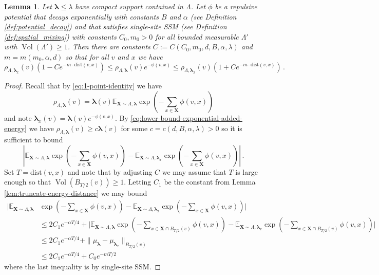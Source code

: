\documentclass[10pt]{amsart}
\newtheorem{lemma}[theorem]{Lemma}
\theoremstyle{definition}
\theoremstyle{remark}
\newcommand{\bX}{\mathbf{X}}
\newcommand{\Vol}{\operatorname{Vol}}
\newcommand{\blambda}{{\boldsymbol{\lambda}}}
\newcommand{\dist}{\mathrm{dist}}
\newcommand{\E}{\mathbb{E}}
\begin{document}
	\begin{lemma}\label{lem:1-pt-SSSSM}
		Let $\blambda \leq \lambda$ have compact support contained in $\Lambda$.   Let $\phi$ be a repulsive potential that decays exponentially with constants $B$ and $\alpha$ (see Definition \ref{def:potential_decay}) and that satisfies single-site SSM (see Definition \ref{def:spatial_mixing}) with constants $C_0,m_0 > 0$ for all bounded measurable $\Lambda'$ with $\Vol(\Lambda') \geq 1$.  Then there are constants $C := C(C_0,m_0,d,B,\alpha,\lambda)$ and $m = m(m_0,\alpha,d)$ so that for all $v$ and $x$ we have \begin{equation*}
			\rho_{\Lambda,\blambda_x}(v)\left( 1 - C e^{-m \cdot\dist(v,x)}\right) \leq \rho_{\Lambda,\blambda}(v) e^{-\phi(v,x)} \leq \rho_{\Lambda,\blambda_x}(v)\left( 1 + C e^{-m \cdot\dist(v,x)}\right)\,.
		\end{equation*}
	\end{lemma}
	\begin{proof}
		Recall that by \eqref{eq:1-point-identity} we have $$\rho_{\Lambda,\blambda}(v) = \blambda(v) \E_{\bX \sim \Lambda, \blambda} \exp\left(-\sum_{x \in \bX} \phi(v,x) \right)$$
		and note $\blambda_x(v) = \blambda(v) e^{-\phi(v,x)}.$
		By \eqref{eq:lower-bound-exponential-added-energy} we have $\rho_{\Lambda,\blambda}(v) \geq c\blambda(v)$ for some $c = c(d,B,\alpha,\lambda) > 0$ so it is sufficient to bound \begin{equation*}
			\left|\E_{\bX \sim \Lambda, \blambda} \exp\left(-\sum_{x \in \bX} \phi(v,x) \right) - \E_{\bX \sim \Lambda, \blambda_x} \exp\left(-\sum_{x \in \bX} \phi(v,x) \right) \right|\,.
		\end{equation*}
		Set $T = \dist(v,x)$ and note that by adjusting $C$ we may assume that $T$ is large enough so that $\Vol(B_{T/2}(v)) \geq 1$.  Letting $C_1$ be the constant from Lemma \ref{lem:truncate-energy-distance} we may bound \begin{align*}
			\Bigg|\E_{\bX \sim \Lambda, \blambda}& \exp\left(-\sum_{x \in \bX} \phi(v,x) \right) - \E_{\bX \sim \Lambda, \blambda_x} \exp\left(-\sum_{x \in \bX} \phi(v,x) \right) \Bigg| \\
			&\leq 2 C_1 e^{-\alpha T/4} +         \Bigg|\E_{\bX \sim \Lambda, \blambda} \exp\left(-\sum_{x \in \bX \cap B_{T/2}(v)} \phi(v,x) \right) - \E_{\bX \sim \Lambda,\blambda_x} \exp\left(-\sum_{x \in \bX \cap B_{T/2}(v)} \phi(v,x) \right) \Bigg| \\
			&\leq 2 C_1 e^{-\alpha T/4} + \|\mu_{\blambda} - \mu_{\blambda_x}\|_{B_{T/2}(v)}\\
			&\leq 2 C_1 e^{-\alpha T/4} + C_0 e^{-m T/2}
		\end{align*} 
		where the last inequality is by single-site SSM.  
	\end{proof}
	
\end{document}
